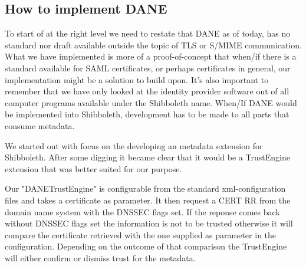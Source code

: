 \subsection{How to implement DANE}
To start of at the right level we need to restate that DANE as of today, has no standard nor draft available outside the topic of TLS or S/MIME communication.
What we have implemented is more of a proof-of-concept that when/if there is a standard available for SAML certificates, or perhaps certificates in general, our implementation might be a solution to build upon.
It's also important to remember that we have only looked at the identity provider software out of all computer programs available under the Shibboleth name.
When/If DANE would be implemented into Shibboleth, development has to be made to all parts that consume metadata.

We started out with focus on the developing an metadata extension for Shibboleth.
After some digging it became clear that it would be a TrustEngine extension that was better suited for our purpose.

Our "DANETrustEngine" is configurable from the standard xml-configuration files and takes a certificate as parameter.
It then request a CERT RR from the domain name system with the DNSSEC flags set. 
If the reponse comes back without DNSSEC flags set the information is not to be trusted otherwise it will compare the certificate retrieved with the one supplied as parameter in the configuration.
Depending on the outcome of that comparison the TrustEngine will either confirm or dismiss trust for the metadata.





